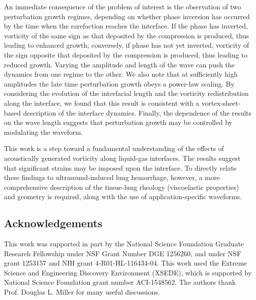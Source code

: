 \documentclass{jfm}%
\begin{document}
An immediate consequence of the problem of interest is the observation
of two perturbation growth regimes, depending on whether phase
inversion has occurred by the time when the rarefaction reaches the
interface. If the phase has inverted, vorticity of the same sign as
that deposited by the compression is produced, thus leading to
enhanced growth; conversely, if phase has not yet inverted, vorticity
of the sign opposite that deposited by the compression is produced,
thus leading to reduced growth. Varying the amplitude and length of the
wave can push the dynamics from one regime to the other.  We also note
that at sufficiently high amplitudes the late time perturbation growth
obeys a power-law scaling. By considering the evolution of the
interfacial length and the vorticity redistribution along the
interface, we found that this result is consistent with a
vortex-sheet-based description of the interface dynamics. Finally, the
dependence of the results on the wave length suggests that
perturbation growth may be controlled by modulating the waveform.

This work is a step toward a fundamental understanding of the effects
of acoustically generated vorticity along liquid-gas interfaces. The
results suggest that significant strains may be imposed upon the
interface. To directly relate these findings to ultrasound-induced lung
hemorrhage, however, a more comprehensive description of the
tissue-lung rheology (viscoelastic properties) and geometry is
required, along with the use of application-specific waveforms.




\subsection*{Acknowledgements}

This work was supported in part by the National Science Foundation
Graduate Research Fellowship under NSF Grant Number DGE 1256260, and
under NSF grant 1253157 and NIH grant 4-R01-HL-116434-04. This work
used the Extreme Science and Engineering Discovery Environment
(XSEDE), which is supported by National Science Foundation grant
number ACI-1548562. The authors thank Prof. Douglas L. Miller for many
useful discussions.\nocite{Towns2014}


\appendix
\end{document}
